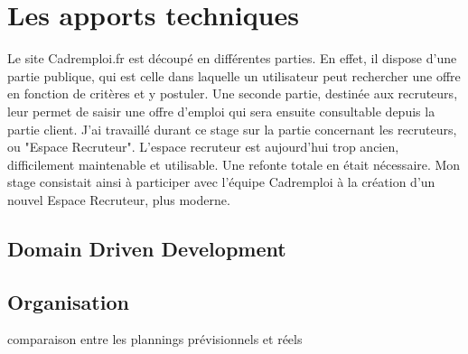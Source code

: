 
\chapter{Les apports techniques} %

\label{apports} %



Le site Cadremploi.fr est découpé en différentes parties.
En effet, il dispose d'une partie publique, qui est celle dans laquelle un utilisateur peut rechercher une offre en fonction de critères et y postuler.
Une seconde partie, destinée aux recruteurs, leur permet de saisir une offre d'emploi qui sera ensuite consultable depuis la partie client.
J'ai travaillé durant ce stage sur la partie concernant les recruteurs, ou "Espace Recruteur".
L'espace recruteur est aujourd'hui trop ancien, difficilement maintenable et utilisable.
Une refonte totale en était nécessaire.
Mon stage consistait ainsi à participer avec l'équipe Cadremploi à la création d'un nouvel Espace Recruteur, plus moderne.









\section{Domain Driven Development}


\section{Organisation}
comparaison entre les plannings prévisionnels et réels



